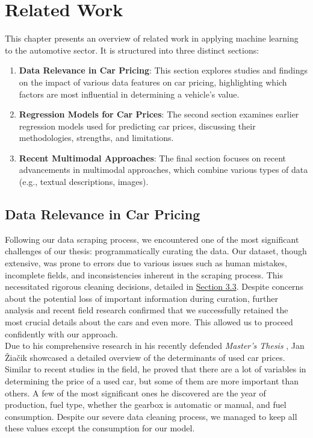 \chapter{Related Work}

This chapter presents an overview of related work in applying machine learning to the automotive sector. It is structured into three distinct sections:

\begin{enumerate}
    \item \textbf{Data Relevance in Car Pricing}: This section explores studies and findings on the impact of various data features on car pricing, highlighting which factors are most influential in determining a vehicle's value.
    \item \textbf{Regression Models for Car Prices}: The second section examines earlier regression models used for predicting car prices, discussing their methodologies, strengths, and limitations.
    \item \textbf{Recent Multimodal Approaches}: The final section focuses on recent advancements in multimodal approaches, which combine various types of data (e.g., textual descriptions, images).
\end{enumerate}

\section{Data Relevance in Car Pricing}
Following our data scraping process, we encountered one of the most significant challenges of our thesis: programmatically curating the data. Our dataset, though extensive, was prone to errors due to various issues such as human mistakes, incomplete fields, and inconsistencies inherent in the scraping process. This necessitated rigorous cleaning decisions, detailed in \hyperref[sec:data-cleaning]{Section 3.3}. Despite concerns about the potential loss of important information during curation, further analysis and recent field research confirmed that we successfully retained the most crucial details about the cars and even more. This allowed us to proceed confidently with our approach.
\\

Due to his comprehensive research in his recently defended \textit{Master's Thesis} \cite{czech}, Jan Žiačik showcased a detailed overview of the determinants of used car prices. Similar to recent studies in the field, he proved that there are a lot of variables in determining the price of a used car, but some of them are more important than others. A few of the most significant ones he discovered are the year of production, fuel type, whether the gearbox is automatic or manual, and fuel consumption. Despite our severe data cleaning process, we managed to keep all these values except the consumption for our model.

